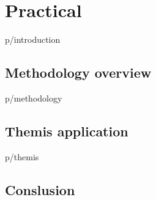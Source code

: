 \documentclass[12pt,oneside,a4paper]{report} %
\begin{document}
\part{Practical}
	{p/introduction}
	\chapter{Methodology overview}
	{p/methodology}

	\chapter{Themis application}
		{p/themis}

	\chapter{Conslusion}

\printglossary[type=acronym,title=List of Abbreviations,toctitle=List of Abbreviations]

\newpage
{} \label{listoffig}
\listoffigures

\newpage
{} \label{listoftab}
\listoftables
\cleardoublepage

{}





\end{document}
